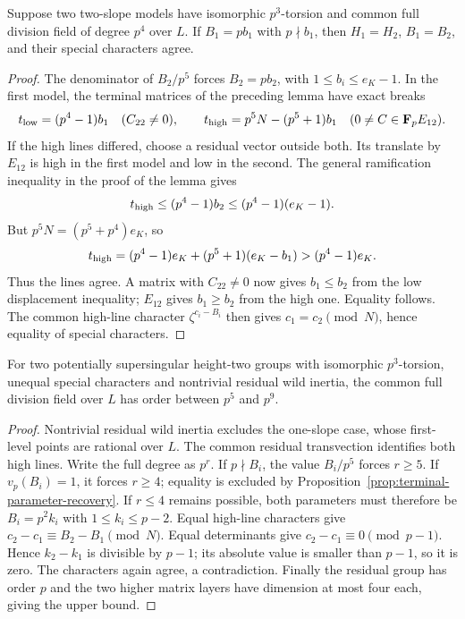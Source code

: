 \begin{proposition}\label{prop:terminal-parameter-recovery}
Suppose two two-slope models have isomorphic $p^3$-torsion and common full division field of degree $p^4$ over $L$. If $B_1=pb_1$ with $p\nmid b_1$, then $H_1=H_2$, $B_1=B_2$, and their special characters agree.
\end{proposition}
\begin{proof}
The denominator of $B_2/p^5$ forces $B_2=pb_2$, with $1\le b_i\le e_K-1$. In the first model, the terminal matrices of the preceding lemma have exact breaks
\[
 t_{\rm low}=(p^4-1)b_1\quad(C_{22}\ne0),\qquad
 t_{\rm high}=p^5N-(p^5+1)b_1\quad(0\ne C\in\mathbf F_pE_{12}).
\]
If the high lines differed, choose a residual vector outside both. Its translate by $E_{12}$ is high in the first model and low in the second. The general ramification inequality in the proof of the lemma gives
\[
 t_{\rm high}\le(p^4-1)b_2\le(p^4-1)(e_K-1).
\]
But $p^5N=(p^5+p^4)e_K$, so
\[
 t_{\rm high}=(p^4-1)e_K+(p^5+1)(e_K-b_1)>(p^4-1)e_K.
\]
Thus the lines agree. A matrix with $C_{22}\ne0$ now gives $b_1\le b_2$ from the low displacement inequality; $E_{12}$ gives $b_1\ge b_2$ from the high one. Equality follows. The common high-line character $\zeta^{c_i-B_i}$ then gives $c_1=c_2\pmod N$, hence equality of special characters.
\end{proof}

\begin{corollary}\label{cor:wild-image-at-least-five}
For two potentially supersingular height-two groups with isomorphic $p^3$-torsion, unequal special characters and nontrivial residual wild inertia, the common full division field over $L$ has order between $p^5$ and $p^9$.
\end{corollary}
\begin{proof}
Nontrivial residual wild inertia excludes the one-slope case, whose first-level points are rational over $L$. The common residual transvection identifies both high lines. Write the full degree as $p^r$. If $p\nmid B_i$, the value $B_i/p^5$ forces $r\ge5$. If $v_p(B_i)=1$, it forces $r\ge4$; equality is excluded by Proposition~\ref{prop:terminal-parameter-recovery}. If $r\le4$ remains possible, both parameters must therefore be $B_i=p^2k_i$ with $1\le k_i\le p-2$. Equal high-line characters give $c_2-c_1\equiv B_2-B_1\pmod N$. Equal determinants give $c_2-c_1\equiv0\pmod{p-1}$. Hence $k_2-k_1$ is divisible by $p-1$; its absolute value is smaller than $p-1$, so it is zero. The characters again agree, a contradiction. Finally the residual group has order $p$ and the two higher matrix layers have dimension at most four each, giving the upper bound.
\end{proof}

